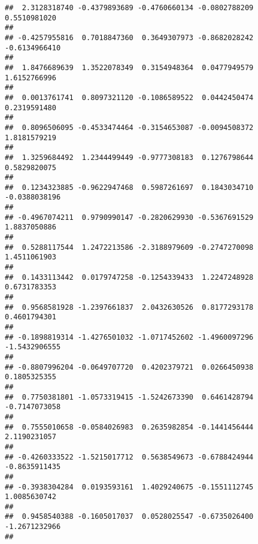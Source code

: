 \documentclass[]{article}
\begin{document}
\begin{verbatim}
##  2.3128318740 -0.4379893689 -0.4760660134 -0.0802788209  0.5510981020 
##                                                                       
## -0.4257955816  0.7018847360  0.3649307973 -0.8682028242 -0.6134966410 
##                                                                       
##  1.8476689639  1.3522078349  0.3154948364  0.0477949579  1.6152766996 
##                                                                       
##  0.0013761741  0.8097321120 -0.1086589522  0.0442450474  0.2319591480 
##                                                                       
##  0.8096506095 -0.4533474464 -0.3154653087 -0.0094508372  1.8181579219 
##                                                                       
##  1.3259684492  1.2344499449 -0.9777308183  0.1276798644  0.5829820075 
##                                                                       
##  0.1234323885 -0.9622947468  0.5987261697  0.1843034710 -0.0388038196 
##                                                                       
## -0.4967074211  0.9790990147 -0.2820629930 -0.5367691529  1.8837050886 
##                                                                       
##  0.5288117544  1.2472213586 -2.3188979609 -0.2747270098  1.4511061903 
##                                                                       
##  0.1433113442  0.0179747258 -0.1254339433  1.2247248928  0.6731783353 
##                                                                       
##  0.9568581928 -1.2397661837  2.0432630526  0.8177293178  0.4601794301 
##                                                                       
## -0.1898819314 -1.4276501032 -1.0717452602 -1.4960097296 -1.5432906555 
##                                                                       
## -0.8807996204 -0.0649707720  0.4202379721  0.0266450938  0.1805325355 
##                                                                       
##  0.7750381801 -1.0573319415 -1.5242673390  0.6461428794 -0.7147073058 
##                                                                       
##  0.7555010658 -0.0584026983  0.2635982854 -0.1441456444  2.1190231057 
##                                                                       
## -0.4260333522 -1.5215017712  0.5638549673 -0.6788424944 -0.8635911435 
##                                                                       
## -0.3938304284  0.0193593161  1.4029240675 -0.1551112745  1.0085630742 
##                                                                       
##  0.9458540388 -0.1605017037  0.0528025547 -0.6735026400 -1.2671232966 
##                                                                       

\end{verbatim}
\end{document}
